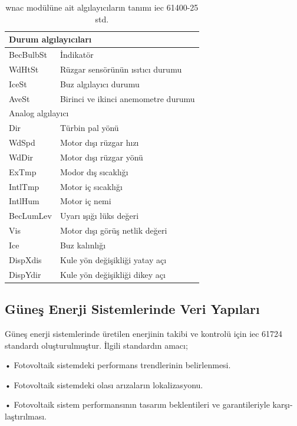 \begin{table}[htbp]
\centering
\caption{\gls{wnac} modülüne ait algılayıcıların tanımı \gls{iec} 61400-25 std.}
\label{tab:WNACdetay}
\begin{tabular}{ll}
\multicolumn{2}{l}{Durum algılayıcıları}        \\ \hline
BecBulbSt & İndikatör                           \\
WdHtSt    & Rüzgar sensörünün ısıtıcı durumu    \\
IceSt     & Buz algılayıcı durumu               \\
AveSt     & Birinci ve ikinci anemometre durumu \\
\multicolumn{2}{l}{Analog algılayıcı}           \\ \hline
Dir       & Türbin pal yönü                     \\
WdSpd     & Motor dışı rüzgar hızı              \\
WdDir     & Motor dışı rüzgar yönü              \\
ExTmp     & Modor dış sıcaklığı                 \\
IntlTmp   & Motor iç sıcaklığı                  \\
IntlHum   & Motor iç nemi                       \\
BecLumLev & Uyarı ışığı lüks değeri             \\
Vis       & Motor dışı görüş netlik değeri      \\
Ice       & Buz kalınlığı                       \\
DispXdis  & Kule yön değişikliği yatay açı      \\
DispYdir  & Kule yön değişikliği dikey açı      \\ \hline
\end{tabular}
\end{table}


\subsection{Güneş Enerji Sistemlerinde Veri Yapıları}
Güneş enerji sistemlerinde üretilen enerjinin takibi ve kontrolü için \gls{iec} 61724 standardı oluşturulmuştur. İlgili standardın amacı;

•	Fotovoltaik sistemdeki performans trendlerinin belirlenmesi.

•	Fotovoltaik sistemdeki olası arızaların lokalizasyonu.

•	Fotovoltaik sistem performansının tasarım beklentileri ve garantileriyle karşı-laştırılması.

